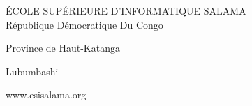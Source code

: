 \documentclass[a4paper,11pt]{report}
\begin{document}

    \begin{titlepage}
        \begin{center}
            {\Large ÉCOLE SUPÉRIEURE D’INFORMATIQUE SALAMA}\\
            République Démocratique Du Congo
            
            Province de Haut-Katanga
            
            Lubumbashi
            
            www.esisalama.org
        \end{center}
    \end{titlepage}
\end{document}
